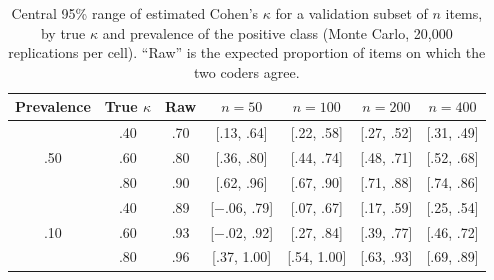 \begin{table}[!ht]
\caption{Central 95\% range of estimated Cohen's $\kappa$ for a validation
subset of $n$ items, by true $\kappa$ and prevalence of the positive class
(Monte Carlo, 20{,}000 replications per cell). ``Raw'' is the expected
proportion of items on which the two coders agree.}
\label{tab:kappa}
\begin{tabular}{ccccccc}
\toprule
Prevalence & True $\kappa$ & Raw & $n=50$ & $n=100$ & $n=200$ & $n=400$ \\
\midrule
\multirow{3}{*}{.50} & .40 & .70 & [.13, .64] & [.22, .58] & [.27, .52] & [.31, .49] \\
                     & .60 & .80 & [.36, .80] & [.44, .74] & [.48, .71] & [.52, .68] \\
                     & .80 & .90 & [.62, .96] & [.67, .90] & [.71, .88] & [.74, .86] \\
\midrule
\multirow{3}{*}{.10} & .40 & .89 & [$-$.06, .79] & [.07, .67] & [.17, .59] & [.25, .54] \\
                     & .60 & .93 & [$-$.02, .92] & [.27, .84] & [.39, .77] & [.46, .72] \\
                     & .80 & .96 & [.37, 1.00] & [.54, 1.00] & [.63, .93] & [.69, .89] \\
\bottomrule
\end{tabular}
\end{table}
